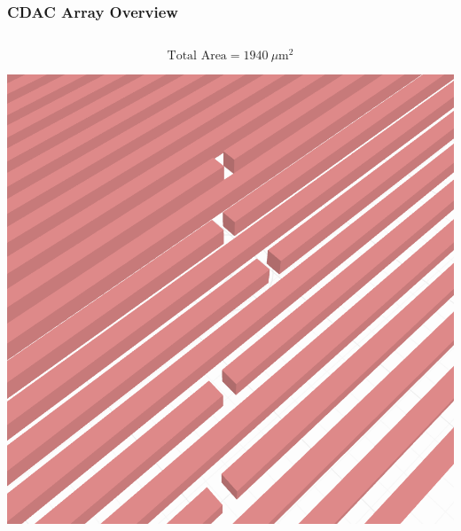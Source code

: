 \documentclass[aspectratio=169]{beamer}
\begin{document}
\begin{frame}
  \frametitle{CDAC Array Overview}

  \begin{columns}
    \begin{column}{0.5\textwidth}
      \[
        \text{Total Area} = 1940~\mu\mathrm{m}^2
      \]
      \begin{center}
        \includegraphics[width=\linewidth,height=0.5\textheight,keepaspectratio]{../images/cdac_array_3d.png}
      \end{center}
    \end{column}


\end{columns}
\end{frame}
\end{document}
